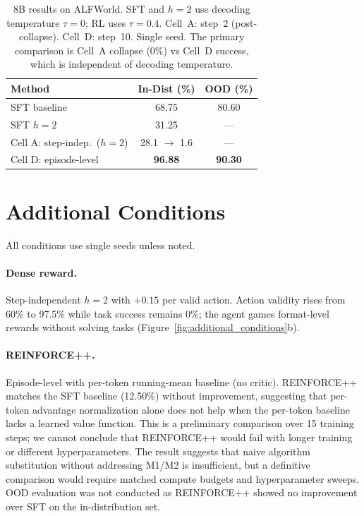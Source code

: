 \begin{table}[h]
\centering
\caption{8B results on ALFWorld. SFT and $h{=}2$ use decoding temperature $\tau{=}0$; RL uses $\tau{=}0.4$. Cell~A: step~2 (post-collapse). Cell~D: step~10. Single seed. The primary comparison is Cell~A collapse (0\%) vs Cell~D success, which is independent of decoding temperature.}
\label{tab:8b_results}
\small
\begin{tabular}{@{}lcc@{}}
\toprule
\textbf{Method} & \textbf{In-Dist (\%)} & \textbf{OOD (\%)} \\
\midrule
SFT baseline & 68.75 & 80.60 \\
SFT $h{=}2$ & 31.25 & --- \\
Cell A: step-indep.\ ($h{=}2$) & 28.1 $\to$ 1.6 & --- \\
Cell D: episode-level & \textbf{96.88} & \textbf{90.30} \\
\bottomrule
\end{tabular}
\end{table}

\section{Additional Conditions}
\label{app:additional}

All conditions use single seeds unless noted.

\paragraph{Dense reward.} Step-independent $h{=}2$ with $+0.15$ per valid action. Action validity rises from 60\% to 97.5\% while task success remains 0\%; the agent games format-level rewards without solving tasks (Figure~\ref{fig:additional_conditions}b).
\label{sec:results_dense}

\paragraph{REINFORCE++.} Episode-level with per-token running-mean baseline (no critic). REINFORCE++ matches the SFT baseline (12.50\%) without improvement, suggesting that per-token advantage normalization alone does not help when the per-token baseline lacks a learned value function. This is a preliminary comparison over 15 training steps; we cannot conclude that REINFORCE++ would fail with longer training or different hyperparameters. The result suggests that naive algorithm substitution without addressing M1/M2 is insufficient, but a definitive comparison would require matched compute budgets and hyperparameter sweeps. OOD evaluation was not conducted as REINFORCE++ showed no improvement over SFT on the in-distribution set.

